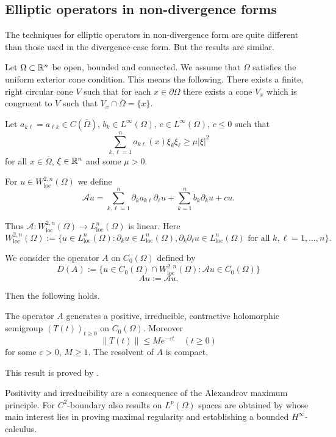 \subsection{Elliptic operators in non-divergence forms}
The techniques for elliptic operators in non-divergence form are quite different than those used in the divergence-case form. But the results are similar.

Let $\Omega \subset \mathbb{R}^n$ be open, bounded and connected. 
We assume that $\Omega$ satisfies the uniform exterior cone condition. 
This means the following. 
There exists a finite, right circular cone $V$ such that for each $x \in \partial\Omega$ there exists a cone $V_x$ which is congruent to $V$ such that $V_x \cap \overline{\Omega} = \{x\}$.

Let $a_{k\ell} = a_{\ell k} \in C(\overline{\Omega})$, $b_k \in L^\infty(\Omega)$, $c \in L^\infty(\Omega)$, $c \leq 0$ such that
\[\sum_{k,\ell=1}^n a_{k\ell}(x)\xi_k\xi_\ell \geq \mu|\xi|^2\]
for all $x \in \overline{\Omega}$, $\xi \in \mathbb{R}^n$ and some $\mu > 0$.

For $u \in W^{2,n}_{\text{loc}}(\Omega)$ we define
\[\mathcal{A}u = \sum_{k,\ell=1}^n \partial_k a_{k\ell} \partial_\ell u + \sum_{k=1}^n b_k \partial_k u + cu.\]

Thus $\mathcal{A} \colon W^{2,n}_{\text{loc}}(\Omega) \to L^n_{\text{loc}}(\Omega)$ is linear. Here
\[W^{2,n}_{\text{loc}}(\Omega) := \{u \in L^n_{\text{loc}}(\Omega) \colon \partial_k u \in L^n_{\text{loc}}(\Omega), \partial_k \partial_\ell u \in L^n_{\text{loc}}(\Omega) \text{ for all } k, \ell = 1, \ldots, n\}.\]

We consider the operator $A$ on $C_0(\Omega)$ defined by
\[D(A) := \{u \in C_0(\Omega) \cap W^{2,n}_{\text{loc}}(\Omega) \colon \mathcal{A}u \in C_0(\Omega)\}\]
\[Au := \mathcal{A}u.\]

Then the following holds.

\begin{theorem}
The operator $A$ generates a positive, irreducible, contractive holomorphic semigroup $(T(t))_{t \geq 0}$ on $C_0(\Omega)$. Moreover
\[\|T(t)\| \leq Me^{-\varepsilon t} \quad (t \geq 0)\]
for some $\varepsilon > 0$, $M \geq 1$. The resolvent of $A$ is compact.
\end{theorem}
This result is proved by \citet[Prop. 4.7]{AS14}. 

Positivity and irreducibility are a consequence of the Alexandrov maximum principle. For $C^2$-boundary also results on $L^p(\Omega)$ spaces are obtained by \citet{DHP03} whose main interest lies in proving maximal regularity and establishing a bounded $H^\infty$-calculus.

